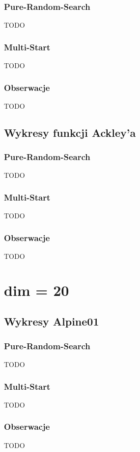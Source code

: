\documentclass{lab}
\begin{document}
\subsubsection{Pure-Random-Search}
TODO

\subsubsection{Multi-Start}
TODO

\subsubsection{Obserwacje}
TODO

\subsection{Wykresy funkcji Ackley’a}
\subsubsection{Pure-Random-Search}
TODO

\subsubsection{Multi-Start}
TODO

\subsubsection{Obserwacje}
TODO

\section{dim = 20}
\subsection{Wykresy Alpine01}
\subsubsection{Pure-Random-Search}
TODO

\subsubsection{Multi-Start}
TODO

\subsubsection{Obserwacje}
TODO
\end{document}
